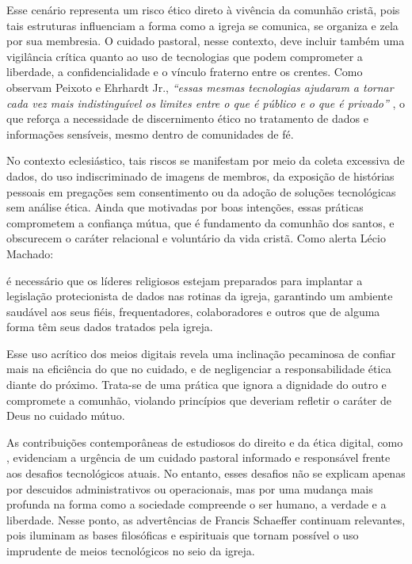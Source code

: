 Esse cenário representa um risco ético direto à vivência da comunhão cristã, pois tais estruturas influenciam a forma como a igreja se comunica, se organiza e zela por sua membresia. O cuidado pastoral, nesse contexto, deve incluir também uma vigilância crítica quanto ao uso de tecnologias que podem comprometer a liberdade, a confidencialidade e o vínculo fraterno entre os crentes. Como observam Peixoto e Ehrhardt Jr., \textit{``essas mesmas tecnologias ajudaram a tornar cada vez mais indistinguível os limites entre o que é público e o que é privado''} \cite[p.~43]{peixoto2020ressignificacao}, o que reforça a necessidade de discernimento ético no tratamento de dados e informações sensíveis, mesmo dentro de comunidades de fé.

No contexto eclesiástico, tais riscos se manifestam por meio da coleta excessiva de dados, do uso indiscriminado de imagens de membros, da exposição de histórias pessoais em pregações sem consentimento ou da adoção de soluções tecnológicas sem análise ética. Ainda que motivadas por boas intenções, essas práticas comprometem a confiança mútua, que é fundamento da comunhão dos santos, e obscurecem o caráter relacional e voluntário da vida cristã. Como alerta Lécio Machado:
\begin{citacao}
    é necessário que os líderes religiosos estejam preparados para implantar a legislação protecionista de dados nas rotinas da igreja, garantindo um ambiente saudável aos seus fiéis, frequentadores, colaboradores e outros que de alguma forma têm seus dados tratados pela igreja. \cite[p.~5]{machado2020}
\end{citacao}

Esse uso acrítico dos meios digitais revela uma inclinação pecaminosa de confiar mais na eficiência do que no cuidado, e de negligenciar a responsabilidade ética diante do próximo. Trata-se de uma prática que ignora a dignidade do outro e compromete a comunhão, violando princípios que deveriam refletir o caráter de Deus no cuidado mútuo.

As contribuições contemporâneas de estudiosos do direito e da ética digital, como , evidenciam a urgência de um cuidado pastoral informado e responsável frente aos desafios tecnológicos atuais. No entanto, esses desafios não se explicam apenas por descuidos administrativos ou operacionais, mas por uma mudança mais profunda na forma como a sociedade compreende o ser humano, a verdade e a liberdade. Nesse ponto, as advertências de Francis Schaeffer continuam relevantes, pois iluminam as bases filosóficas e espirituais que tornam possível o uso imprudente de meios tecnológicos no seio da igreja.

